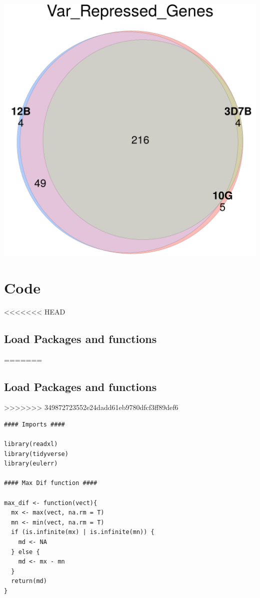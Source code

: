\documentclass[11pt]{article}
\begin{document}
\begin{center}
\includegraphics[width=.9\linewidth]{./Plots/venn_Var_Repressed_Genes.png}
\end{center}

\section{Code}
<<<<<<< HEAD
\label{sec:orgcb925b1}
\subsection{Load Packages and functions}
\label{sec:org834e412}
=======
\label{sec:org862a98b}
\subsection{Load Packages and functions}
\label{sec:org6f0fca3}
>>>>>>> 349872723552e24dadd61eb9780dfcf3ff89def6
\begin{verbatim}
#### Imports ####

library(readxl)
library(tidyverse)
library(eulerr)

#### Max Dif function ####

max_dif <- function(vect){
  mx <- max(vect, na.rm = T)
  mn <- min(vect, na.rm = T)
  if (is.infinite(mx) | is.infinite(mn)) {
    md <- NA
  } else {
    md <- mx - mn
  }
  return(md)
}
\end{verbatim}
\end{document}
